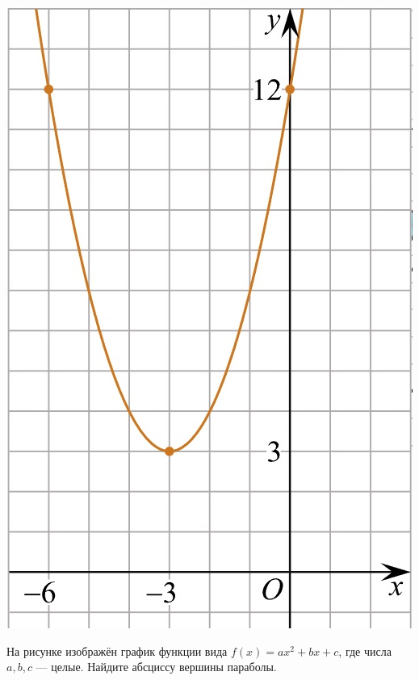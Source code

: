 \begin{class}[number=4]
\begin{listofex}
\begin{minipage}[c]{0.25\textwidth}
			\includegraphics[align=t, width=\textwidth]{pics/G101M4C4-5.jpg}
		\end{minipage}
		\item
		\begin{minipage}[t]{0.67\textwidth}
			На рисунке изображён график функции вида \(f(x)=ax^2+bx+c\), где числа \(a, b, c\) --- целые. Найдите абсциссу вершины параболы.
		\end{minipage}
		\begin{minipage}[c]{0.25\textwidth}

\end{minipage}
\end{listofex}
\end{class}
